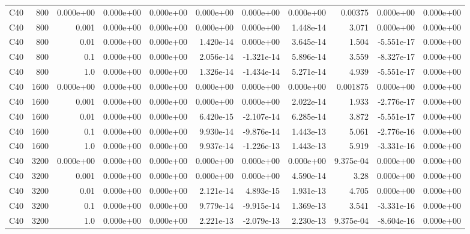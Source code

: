 \begin{table}[!htb]
{\begin{tabular}{@{}lrrrrrrrrrr@{}}
C40 & 800 & 0.000e+00 & 0.000e+00 & 0.000e+00 & 0.000e+00 & 0.000e+00 & 0.000e+00 & 0.00375 & 0.000e+00 & 0.000e+00 \\
C40 & 800 & 0.001 & 0.000e+00 & 0.000e+00 & 0.000e+00 & 0.000e+00 & 1.448e-14 & 3.071 & 0.000e+00 & 0.000e+00 \\
C40 & 800 & 0.01 & 0.000e+00 & 0.000e+00 & 1.420e-14 & 0.000e+00 & 3.645e-14 & 1.504 & -5.551e-17 & 0.000e+00 \\
C40 & 800 & 0.1 & 0.000e+00 & 0.000e+00 & 2.056e-14 & -1.321e-14 & 5.896e-14 & 3.559 & -8.327e-17 & 0.000e+00 \\
C40 & 800 & 1.0 & 0.000e+00 & 0.000e+00 & 1.326e-14 & -1.434e-14 & 5.271e-14 & 4.939 & -5.551e-17 & 0.000e+00 \\
C40 & 1600 & 0.000e+00 & 0.000e+00 & 0.000e+00 & 0.000e+00 & 0.000e+00 & 0.000e+00 & 0.001875 & 0.000e+00 & 0.000e+00 \\
C40 & 1600 & 0.001 & 0.000e+00 & 0.000e+00 & 0.000e+00 & 0.000e+00 & 2.022e-14 & 1.933 & -2.776e-17 & 0.000e+00 \\
C40 & 1600 & 0.01 & 0.000e+00 & 0.000e+00 & 6.420e-15 & -2.107e-14 & 6.285e-14 & 3.872 & -5.551e-17 & 0.000e+00 \\
C40 & 1600 & 0.1 & 0.000e+00 & 0.000e+00 & 9.930e-14 & -9.876e-14 & 1.443e-13 & 5.061 & -2.776e-16 & 0.000e+00 \\
C40 & 1600 & 1.0 & 0.000e+00 & 0.000e+00 & 9.937e-14 & -1.226e-13 & 1.443e-13 & 5.919 & -3.331e-16 & 0.000e+00 \\
C40 & 3200 & 0.000e+00 & 0.000e+00 & 0.000e+00 & 0.000e+00 & 0.000e+00 & 0.000e+00 & 9.375e-04 & 0.000e+00 & 0.000e+00 \\
C40 & 3200 & 0.001 & 0.000e+00 & 0.000e+00 & 0.000e+00 & 0.000e+00 & 4.590e-14 & 3.28 & 0.000e+00 & 0.000e+00 \\
C40 & 3200 & 0.01 & 0.000e+00 & 0.000e+00 & 2.121e-14 & 4.893e-15 & 1.931e-13 & 4.705 & 0.000e+00 & 0.000e+00 \\
C40 & 3200 & 0.1 & 0.000e+00 & 0.000e+00 & 9.779e-14 & -9.915e-14 & 1.369e-13 & 3.541 & -3.331e-16 & 0.000e+00 \\
C40 & 3200 & 1.0 & 0.000e+00 & 0.000e+00 & 2.221e-13 & -2.079e-13 & 2.230e-13 & 9.375e-04 & -8.604e-16 & 0.000e+00 \\
        \bottomrule
    \end{tabular}%
    }
\end{table}
